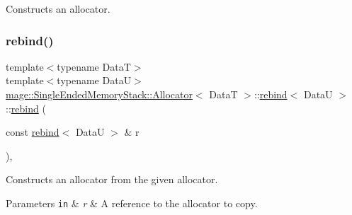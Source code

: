 Constructs an allocator. \hypertarget{structmage_1_1_single_ended_memory_stack_1_1_allocator_1_1rebind_af8761e57c718fe852e4b36e897a28534}{}\label{structmage_1_1_single_ended_memory_stack_1_1_allocator_1_1rebind_af8761e57c718fe852e4b36e897a28534} 
\subsubsection{\texorpdfstring{rebind()}{rebind()}\hspace{0.1cm}{\footnotesize\ttfamily [2/3]}}
{\footnotesize\ttfamily template$<$typename DataT$>$ \\
template$<$typename DataU$>$ \\
\hyperlink{structmage_1_1_single_ended_memory_stack_1_1_allocator}{mage\+::\+Single\+Ended\+Memory\+Stack\+::\+Allocator}$<$ DataT $>$\+::\hyperlink{structmage_1_1_single_ended_memory_stack_1_1_allocator_1_1rebind}{rebind}$<$ DataU $>$\+::\hyperlink{structmage_1_1_single_ended_memory_stack_1_1_allocator_1_1rebind}{rebind} (\begin{DoxyParamCaption}\item[{const \hyperlink{structmage_1_1_single_ended_memory_stack_1_1_allocator_1_1rebind}{rebind}$<$ DataU $>$ \&}]{r }\end{DoxyParamCaption})\hspace{0.3cm}{\ttfamily [private]}, {\ttfamily [delete]}}

Constructs an allocator from the given allocator.


\begin{DoxyParams}[1]{Parameters}
\mbox{\tt in}  & {\em r} & A reference to the allocator to copy. \\
\hline
\end{DoxyParams}
\hypertarget{structmage_1_1_single_ended_memory_stack_1_1_allocator_1_1rebind_a7101dfb156adee57b41648a4ab96e3a4}{}\label{structmage_1_1_single_ended_memory_stack_1_1_allocator_1_1rebind_a7101dfb156adee57b41648a4ab96e3a4} 
